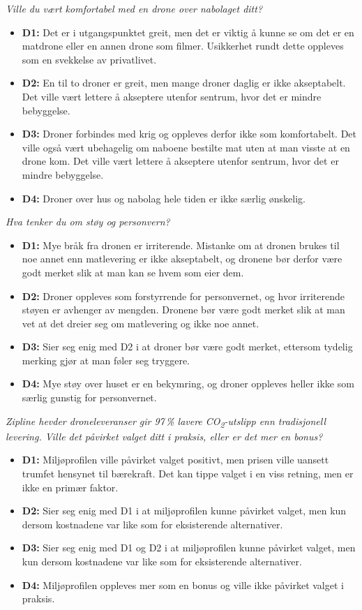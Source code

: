\textit{Ville du vært komfortabel med en drone over nabolaget ditt?}
\begin{itemize}[leftmargin=1.5em, nosep]
  \item \textbf{D1:} Det er i utgangspunktet greit, men det er viktig å kunne se om
  det er en matdrone eller en annen drone som filmer. Usikkerhet rundt dette
  oppleves som en svekkelse av privatlivet.
  \item \textbf{D2:} En til to droner er greit, men mange droner daglig er
  ikke akseptabelt. Det ville vært lettere å akseptere utenfor sentrum, hvor
  det er mindre bebyggelse.
  \item \textbf{D3:} Droner forbindes med krig og oppleves derfor ikke som
  komfortabelt. Det ville også vært ubehagelig om naboene bestilte mat uten
  at man visste at en drone kom. Det ville vært lettere å akseptere utenfor
  sentrum, hvor det er mindre bebyggelse.
  \item \textbf{D4:} Droner over hus og nabolag hele tiden er ikke særlig
  ønskelig.
\end{itemize}

\textit{Hva tenker du om støy og personvern?}
\begin{itemize}[leftmargin=1.5em, nosep]
  \item \textbf{D1:} Mye bråk fra dronen er irriterende. Mistanke om at
  dronen brukes til noe annet enn matlevering er ikke akseptabelt, og
  dronene bør derfor være godt merket slik at man kan se hvem som eier dem.
  \item \textbf{D2:} Droner oppleves som forstyrrende for personvernet, og
  hvor irriterende støyen er avhenger av mengden. Dronene bør være godt
  merket slik at man vet at det dreier seg om matlevering og ikke noe annet.
  \item \textbf{D3:} Sier seg enig med D2 i at droner bør være godt merket,
  ettersom tydelig merking gjør at man føler seg tryggere.
  \item \textbf{D4:} Mye støy over huset er en bekymring, og droner oppleves
  heller ikke som særlig gunstig for personvernet.
\end{itemize}

\textit{Zipline hevder droneleveranser gir 97\,\% lavere
CO\textsubscript{2}-utslipp enn tradisjonell levering. Ville det påvirket
valget ditt i praksis, eller er det mer en bonus?}
\begin{itemize}[leftmargin=1.5em, nosep]
  \item \textbf{D1:} Miljøprofilen ville påvirket valget positivt, men
  prisen ville uansett trumfet hensynet til bærekraft. Det kan tippe valget
  i en viss retning, men er ikke en primær faktor.
  \item \textbf{D2:} Sier seg enig med D1 i at miljøprofilen kunne påvirket
  valget, men kun dersom kostnadene var like som for eksisterende
  alternativer.
  \item \textbf{D3:} Sier seg enig med D1 og D2 i at miljøprofilen kunne
  påvirket valget, men kun dersom kostnadene var like som for eksisterende
  alternativer.
  \item \textbf{D4:} Miljøprofilen oppleves mer som en bonus og ville ikke
  påvirket valget i praksis.
\end{itemize}

